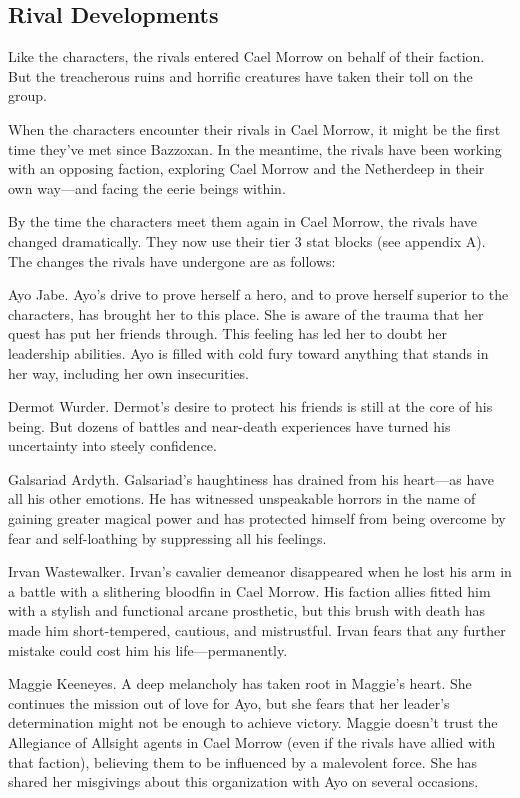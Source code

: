 \documentclass[10pt,a4paper,twoside,fancy,bg=print,twocolumn,openany,nodeprecatedcode]{dndbook}
\begin{document}
\subsection{Rival Developments}
Like the characters, the rivals entered Cael Morrow on behalf of their faction. But the treacherous ruins and horrific creatures have taken their toll on the group.

When the characters encounter their rivals in Cael Morrow, it might be the first time they've met since Bazzoxan. In the meantime, the rivals have been working with an opposing faction, exploring Cael Morrow and the Netherdeep in their own way—and facing the eerie beings within.

By the time the characters meet them again in Cael Morrow, the rivals have changed dramatically. They now use their tier 3 stat blocks (see appendix A). The changes the rivals have undergone are as follows:

Ayo Jabe. Ayo's drive to prove herself a hero, and to prove herself superior to the characters, has brought her to this place. She is aware of the trauma that her quest has put her friends through. This feeling has led her to doubt her leadership abilities. Ayo is filled with cold fury toward anything that stands in her way, including her own insecurities.

Dermot Wurder. Dermot's desire to protect his friends is still at the core of his being. But dozens of battles and near-death experiences have turned his uncertainty into steely confidence.

Galsariad Ardyth. Galsariad's haughtiness has drained from his heart—as have all his other emotions. He has witnessed unspeakable horrors in the name of gaining greater magical power and has protected himself from being overcome by fear and self-loathing by suppressing all his feelings.

Irvan Wastewalker. Irvan's cavalier demeanor disappeared when he lost his arm in a battle with a slithering bloodfin in Cael Morrow. His faction allies fitted him with a stylish and functional arcane prosthetic, but this brush with death has made him short-tempered, cautious, and mistrustful. Irvan fears that any further mistake could cost him his life—permanently.

Maggie Keeneyes. A deep melancholy has taken root in Maggie's heart. She continues the mission out of love for Ayo, but she fears that her leader's determination might not be enough to achieve victory. Maggie doesn't trust the Allegiance of Allsight agents in Cael Morrow (even if the rivals have allied with that faction), believing them to be influenced by a malevolent force. She has shared her misgivings about this organization with Ayo on several occasions.
\end{document}
